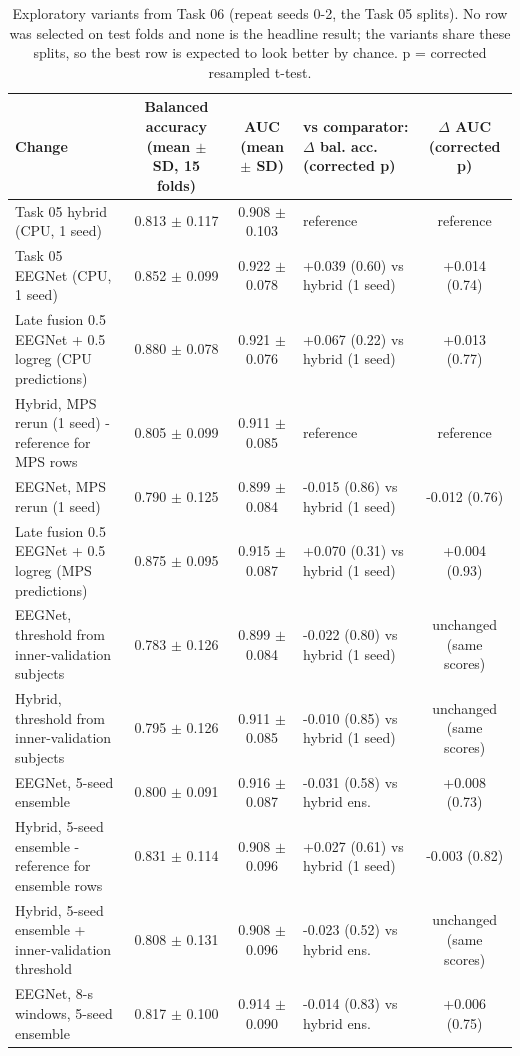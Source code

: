 \begin{table}[!t]
\centering
\footnotesize
\caption{Exploratory variants from Task 06 (repeat seeds 0-2, the Task 05 splits). No row was selected on test folds and none is the headline result; the variants share these splits, so the best row is expected to look better by chance. p = corrected resampled t-test.}
\label{tab:table4_improvements}
\begin{tabular}{p{6.2cm}ccp{3.2cm}c}
\toprule
Change & Balanced accuracy (mean $\pm$ SD, 15 folds) & AUC (mean $\pm$ SD) & vs comparator: $\Delta$ bal. acc. (corrected p) & $\Delta$ AUC (corrected p) \\
\midrule
Task 05 hybrid (CPU, 1 seed) & 0.813 $\pm$ 0.117 & 0.908 $\pm$ 0.103 & reference & reference \\
Task 05 EEGNet (CPU, 1 seed) & 0.852 $\pm$ 0.099 & 0.922 $\pm$ 0.078 & +0.039 (0.60) vs hybrid (1 seed) & +0.014 (0.74) \\
Late fusion 0.5 EEGNet + 0.5 logreg (CPU predictions) & 0.880 $\pm$ 0.078 & 0.921 $\pm$ 0.076 & +0.067 (0.22) vs hybrid (1 seed) & +0.013 (0.77) \\
Hybrid, MPS rerun (1 seed) - reference for MPS rows & 0.805 $\pm$ 0.099 & 0.911 $\pm$ 0.085 & reference & reference \\
EEGNet, MPS rerun (1 seed) & 0.790 $\pm$ 0.125 & 0.899 $\pm$ 0.084 & -0.015 (0.86) vs hybrid (1 seed) & -0.012 (0.76) \\
Late fusion 0.5 EEGNet + 0.5 logreg (MPS predictions) & 0.875 $\pm$ 0.095 & 0.915 $\pm$ 0.087 & +0.070 (0.31) vs hybrid (1 seed) & +0.004 (0.93) \\
EEGNet, threshold from inner-validation subjects & 0.783 $\pm$ 0.126 & 0.899 $\pm$ 0.084 & -0.022 (0.80) vs hybrid (1 seed) & unchanged (same scores) \\
Hybrid, threshold from inner-validation subjects & 0.795 $\pm$ 0.126 & 0.911 $\pm$ 0.085 & -0.010 (0.85) vs hybrid (1 seed) & unchanged (same scores) \\
EEGNet, 5-seed ensemble & 0.800 $\pm$ 0.091 & 0.916 $\pm$ 0.087 & -0.031 (0.58) vs hybrid ens. & +0.008 (0.73) \\
Hybrid, 5-seed ensemble - reference for ensemble rows & 0.831 $\pm$ 0.114 & 0.908 $\pm$ 0.096 & +0.027 (0.61) vs hybrid (1 seed) & -0.003 (0.82) \\
Hybrid, 5-seed ensemble + inner-validation threshold & 0.808 $\pm$ 0.131 & 0.908 $\pm$ 0.096 & -0.023 (0.52) vs hybrid ens. & unchanged (same scores) \\
EEGNet, 8-s windows, 5-seed ensemble & 0.817 $\pm$ 0.100 & 0.914 $\pm$ 0.090 & -0.014 (0.83) vs hybrid ens. & +0.006 (0.75) \\

\end{tabular}
\end{table}
